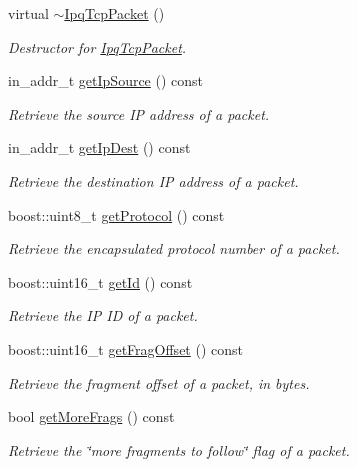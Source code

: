 \begin{DoxyCompactItemize}
virtual \hyperlink{classIPQ_1_1IpqTcpPacket_a0e8394e3fa7f84f86009a5e7d6ffd5d0}{$\sim$\-Ipq\-Tcp\-Packet} ()
\begin{DoxyCompactList}\small\item\em \-Destructor for \hyperlink{classIPQ_1_1IpqTcpPacket}{\-Ipq\-Tcp\-Packet}. \end{DoxyCompactList}\item 
in\-\_\-addr\-\_\-t \hyperlink{classIPQ_1_1IpqIpPacket_a4708c5a987eb9796566e2b3bdd072589}{get\-Ip\-Source} () const 
\begin{DoxyCompactList}\small\item\em \-Retrieve the source \-I\-P address of a packet. \end{DoxyCompactList}\item 
in\-\_\-addr\-\_\-t \hyperlink{classIPQ_1_1IpqIpPacket_a056bedcbf7998452d147f2d2ef68b611}{get\-Ip\-Dest} () const 
\begin{DoxyCompactList}\small\item\em \-Retrieve the destination \-I\-P address of a packet. \end{DoxyCompactList}\item 
boost\-::uint8\-\_\-t \hyperlink{classIPQ_1_1IpqIpPacket_aefa78bb7a89a337bb0c1d88c02d6d5cd}{get\-Protocol} () const 
\begin{DoxyCompactList}\small\item\em \-Retrieve the encapsulated protocol number of a packet. \end{DoxyCompactList}\item 
boost\-::uint16\-\_\-t \hyperlink{classIPQ_1_1IpqIpPacket_a937be4034dafdce171b7e90ae14f09d4}{get\-Id} () const 
\begin{DoxyCompactList}\small\item\em \-Retrieve the \-I\-P \-I\-D of a packet. \end{DoxyCompactList}\item 
boost\-::uint16\-\_\-t \hyperlink{classIPQ_1_1IpqIpPacket_a97e6e13ede2c6c6f028ee0eb1130600b}{get\-Frag\-Offset} () const 
\begin{DoxyCompactList}\small\item\em \-Retrieve the fragment offset of a packet, in bytes. \end{DoxyCompactList}\item 
bool \hyperlink{classIPQ_1_1IpqIpPacket_a76e0d09916fc816df3dab46cb29d479f}{get\-More\-Frags} () const 
\begin{DoxyCompactList}\small\item\em \-Retrieve the \char`\"{}more fragments to follow\char`\"{} flag of a packet. \end{DoxyCompactList}\item 

\end{DoxyCompactItemize}
